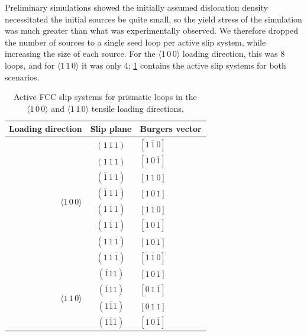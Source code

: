 Preliminary simulations showed the initially assumed dislocation density necessitated the initial sources be quite small, so the yield stress of the simulation was much greater than what was experimentally observed. We therefore dropped the number of sources to a single seed loop per active slip system, while increasing the size of each source. For the $\langle 1\, 0\, 0 \rangle$ loading direction, this was 8 loops, and for $\langle 1\, 1\, 0 \rangle$ it was only 4; \cref{t:slipSystems} contains the active slip systems for both scenarios.
\begin{table}
    \centering
    \caption{Active FCC slip systems for prismatic loops in the $\langle 1\, 0\, 0 \rangle$ and $\langle 1\, 1\, 0 \rangle$ tensile loading directions.}
    \label{t:slipSystems}
    \begin{tabular}{rcl}
        \toprule
        Loading direction                            & Slip plane                          & Burgers vector                      \\
        \midrule
        \multirow{8}{*}{$\langle 1\, 0\, 0 \rangle$} & $\left(1\, 1\, 1\right)$            & $\left[1\, \overline{1}\, 0\right]$ \\
                                                     & $\left(1\, 1\, 1\right)$            & $\left[1\, 0\, \overline{1}\right]$ \\
                                                     & $\left(\overline{1}\, 1\, 1\right)$ & $\left[1\, 1\, 0\right]$            \\
                                                     & $\left(\overline{1}\, 1\, 1\right)$ & $\left[1\, 0\, 1\right]$            \\
                                                     & $\left(1\, \overline{1}\, 1\right)$ & $\left[1\, 1\, 0\right]$            \\
                                                     & $\left(1\, \overline{1}\, 1\right)$ & $\left[1\, 0\, \overline{1}\right]$ \\
                                                     & $\left(1\, 1\, \overline{1}\right)$ & $\left[1\, 0\, 1\right]$            \\
                                                     & $\left(1\, 1\, \overline{1}\right)$ & $\left[1\, \overline{1}\, 0\right]$ \\
        \midrule
        \multirow{4}{*}{$\langle 1\, 1\, 0 \rangle$} & $\left(\overline{1}   1   1\right)$ & $\left[1\, 0\, 1\right]$            \\
                                                     & $\left(\overline{1}   1   1\right)$ & $\left[0\, 1\, \overline{1}\right]$ \\
                                                     & $\left(1  \overline{1}   1\right)$  & $\left[0\, 1\, 1\right]$            \\
                                                     & $\left(1  \overline{1}   1\right)$  & $\left[1\, 0\, \overline{1}\right]$ \\
        \bottomrule
    \end{tabular}
\end{table}
